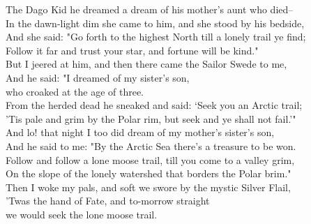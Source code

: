 \begin{poemblock}
The Dago Kid he dreamed a dream of his mother's aunt who died--\\
In the dawn-light dim she came to him, and she stood by his bedside,\\
And she said:  "Go forth to the highest North till a lonely trail ye find;\\
Follow it far and trust your star, and fortune will be kind."\\
But I jeered at him, and then there came the Sailor Swede to me,\\
And he said:  "I dreamed of my sister's son,\\
\idt who croaked at the age of three.\\
From the herded dead he sneaked and said:  `Seek you an Arctic trail;\\
'Tis pale and grim by the Polar rim, but seek and ye shall not fail.'"\\
And lo! that night I too did dream of my mother's sister's son,\\
And he said to me:  "By the Arctic Sea there's a treasure to be won.\\
Follow and follow a lone moose trail, till you come to a valley grim,\\
On the slope of the lonely watershed that borders the Polar brim."\\
Then I woke my pals, and soft we swore by the mystic Silver Flail,\\
'Twas the hand of Fate, and to-morrow straight\\
\idt we would seek the lone moose trail.


\end{poemblock}
